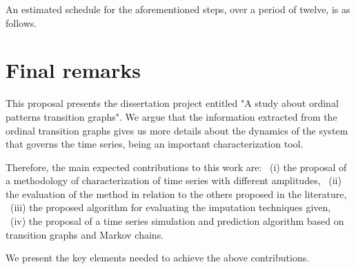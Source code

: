 \documentclass[paper=letter, fontsize=12pt]{article}
\begin{document}
An estimated schedule for the aforementioned steps, over a period of twelve, is as follows.
	
\begin{table}[h!]
\caption{Monthly agenda for 2020}
\label{tab:agenda}
\end{table}

\section{Final remarks}\label{sec:final}

This proposal presents the dissertation project entitled "A study about ordinal patterns transition graphs". 
We argue that the information extracted from the ordinal transition graphs gives us more details about the dynamics of the system that governs the time series, being an important characterization tool.

Therefore, the main expected contributions to this work are:
~(i) the proposal of a methodology of characterization of time series with different amplitudes,
~(ii) the evaluation of the method in relation to the others proposed in the literature, 
~(iii) the proposed algorithm for evaluating the imputation techniques given, 
~(iv) the proposal of a time series simulation and prediction algorithm based on transition graphs and Markov chains.

We present the key elements needed to achieve the above contributions.

	


	
\end{document}
